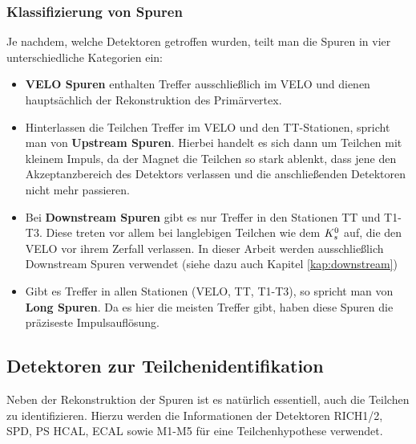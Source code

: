\subsubsection{Klassifizierung von Spuren} \label{kap:spurklassen}
Je nachdem, welche Detektoren getroffen wurden, teilt man die Spuren in vier unterschiedliche Kategorien ein:
\begin{itemize}
\item \textbf{VELO Spuren} enthalten Treffer ausschließlich im VELO und dienen hauptsächlich der Rekonstruktion des Primärvertex.
\item Hinterlassen die Teilchen Treffer im VELO und den TT-Stationen, spricht man von \textbf{Upstream Spuren}. Hierbei handelt es sich dann um Teilchen mit kleinem Impuls, da der Magnet die Teilchen so stark ablenkt, dass jene den Akzeptanzbereich des Detektors verlassen und die anschließenden Detektoren nicht mehr passieren.
\item Bei \textbf{Downstream Spuren} gibt es nur Treffer in den Stationen TT und T1-T3. Diese treten vor allem bei langlebigen Teilchen wie dem $K_s^0$ auf, die den VELO vor ihrem Zerfall verlassen. In dieser Arbeit werden ausschließlich Downstream Spuren verwendet (siehe dazu auch Kapitel \ref{kap:downstream})
\item Gibt es Treffer in allen Stationen (VELO, TT, T1-T3), so spricht man von \textbf{Long Spuren}. Da es hier die meisten Treffer gibt, haben diese Spuren die präziseste Impulsauflösung. \cite{thesis_linn}
\end{itemize}

\subsection{Detektoren zur Teilchenidentifikation}
Neben der Rekonstruktion der Spuren ist es natürlich essentiell, auch die Teilchen zu identifizieren. Hierzu werden die Informationen der Detektoren RICH1/2, SPD, PS HCAL, ECAL sowie M1-M5 für eine Teilchenhypothese verwendet.

